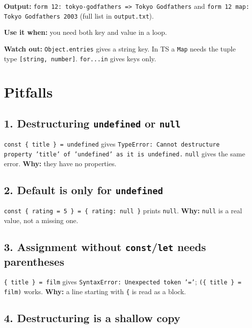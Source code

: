 \documentclass[
  11pt,
]{article}
\begin{document}
\textbf{Output:}
\texttt{form 12: tokyo-godfathers =\textgreater{} Tokyo Godfathers}
and \texttt{form 12 map: Tokyo Godfathers 2003} (full
list in \texttt{output.txt}).

\textbf{Use it when:} you need both key and value in a loop.

\textbf{Watch out:} \texttt{Object.entries} gives a
string key. In TS a \texttt{Map} needs the tuple type
\texttt{[string, number]}.
\texttt{for...in} gives keys only.

\section{Pitfalls}\label{pitfalls}

\subsection{\texorpdfstring{1. Destructuring \texttt{undefined} or
\texttt{null}}{1. Destructuring undefined or null}}\label{destructuring-undefined-or-null}

\texttt{const \{ title \} = undefined} gives
\texttt{TypeError: Cannot destructure property 'title' of 'undefined' as it is undefined.}
\texttt{null} gives the same error. \textbf{Why:} they
have no properties.

\subsection{\texorpdfstring{2. Default is only for
\texttt{undefined}}{2. Default is only for undefined}}\label{default-is-only-for-undefined}

\texttt{const \{ rating = 5 \} = \{ rating: null \}}
prints \texttt{null}. \textbf{Why:}
\texttt{null} is a real value, not a missing one.

\subsection{\texorpdfstring{3. Assignment without
\texttt{const}/\texttt{let} needs
parentheses}{3. Assignment without const/let needs parentheses}}\label{assignment-without-constlet-needs-parentheses}

\texttt{\{ title \} = film} gives
\texttt{SyntaxError: Unexpected token '='};
\texttt{(\{ title \} = film)} works. \textbf{Why:} a
line starting with \texttt{\{} is read as a block.

\subsection{4. Destructuring is a shallow
copy}\label{destructuring-is-a-shallow-copy}
\end{document}
